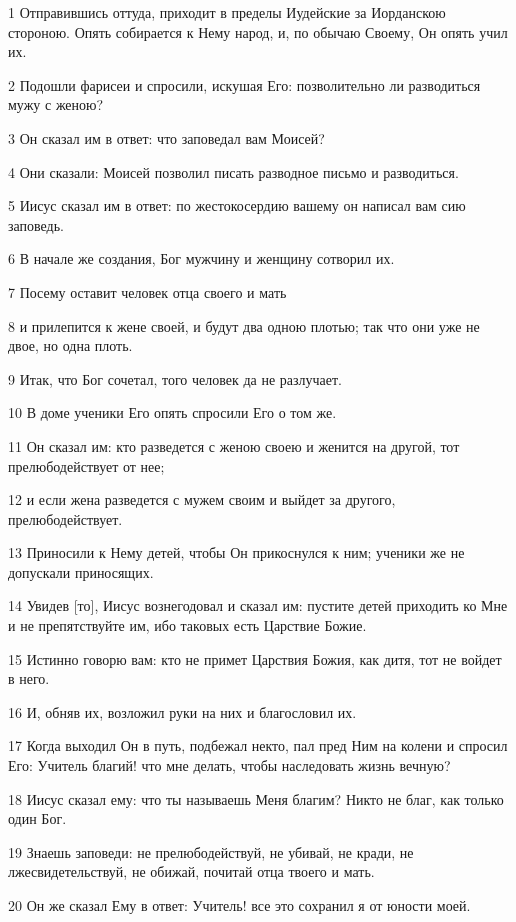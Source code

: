 \par 1 Отправившись оттуда, приходит в пределы Иудейские за Иорданскою стороною. Опять собирается к Нему народ, и, по обычаю Своему, Он опять учил их.
\par 2 Подошли фарисеи и спросили, искушая Его: позволительно ли разводиться мужу с женою?
\par 3 Он сказал им в ответ: что заповедал вам Моисей?
\par 4 Они сказали: Моисей позволил писать разводное письмо и разводиться.
\par 5 Иисус сказал им в ответ: по жестокосердию вашему он написал вам сию заповедь.
\par 6 В начале же создания, Бог мужчину и женщину сотворил их.
\par 7 Посему оставит человек отца своего и мать
\par 8 и прилепится к жене своей, и будут два одною плотью; так что они уже не двое, но одна плоть.
\par 9 Итак, что Бог сочетал, того человек да не разлучает.
\par 10 В доме ученики Его опять спросили Его о том же.
\par 11 Он сказал им: кто разведется с женою своею и женится на другой, тот прелюбодействует от нее;
\par 12 и если жена разведется с мужем своим и выйдет за другого, прелюбодействует.
\par 13 Приносили к Нему детей, чтобы Он прикоснулся к ним; ученики же не допускали приносящих.
\par 14 Увидев [то], Иисус вознегодовал и сказал им: пустите детей приходить ко Мне и не препятствуйте им, ибо таковых есть Царствие Божие.
\par 15 Истинно говорю вам: кто не примет Царствия Божия, как дитя, тот не войдет в него.
\par 16 И, обняв их, возложил руки на них и благословил их.
\par 17 Когда выходил Он в путь, подбежал некто, пал пред Ним на колени и спросил Его: Учитель благий! что мне делать, чтобы наследовать жизнь вечную?
\par 18 Иисус сказал ему: что ты называешь Меня благим? Никто не благ, как только один Бог.
\par 19 Знаешь заповеди: не прелюбодействуй, не убивай, не кради, не лжесвидетельствуй, не обижай, почитай отца твоего и мать.
\par 20 Он же сказал Ему в ответ: Учитель! все это сохранил я от юности моей.

